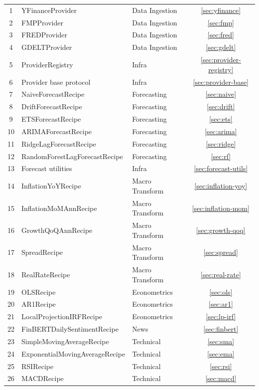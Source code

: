 \documentclass[11pt,a4paper]{article}
\begin{document}
\begin{longtable}{@{}cllc@{}}
  1 & YFinanceProvider & Data Ingestion & \ref{sec:yfinance} \\
  2 & FMPProvider & Data Ingestion & \ref{sec:fmp} \\
  3 & FREDProvider & Data Ingestion & \ref{sec:fred} \\
  4 & GDELTProvider & Data Ingestion & \ref{sec:gdelt} \\
  5 & ProviderRegistry & Infra & \ref{sec:provider-registry} \\
  6 & Provider base protocol & Infra & \ref{sec:provider-base} \\
  7 & NaiveForecastRecipe & Forecasting & \ref{sec:naive} \\
  8 & DriftForecastRecipe & Forecasting & \ref{sec:drift} \\
  9 & ETSForecastRecipe & Forecasting & \ref{sec:ets} \\
  10 & ARIMAForecastRecipe & Forecasting & \ref{sec:arima} \\
  11 & RidgeLagForecastRecipe & Forecasting & \ref{sec:ridge} \\
  12 & RandomForestLagForecastRecipe & Forecasting & \ref{sec:rf} \\
  13 & Forecast utilities & Infra & \ref{sec:forecast-utils} \\
  14 & InflationYoYRecipe & Macro Transform & \ref{sec:inflation-yoy} \\
  15 & InflationMoMAnnRecipe & Macro Transform & \ref{sec:inflation-mom} \\
  16 & GrowthQoQAnnRecipe & Macro Transform & \ref{sec:growth-qoq} \\
  17 & SpreadRecipe & Macro Transform & \ref{sec:spread} \\
  18 & RealRateRecipe & Macro Transform & \ref{sec:real-rate} \\
  19 & OLSRecipe & Econometrics & \ref{sec:ols} \\
  20 & AR1Recipe & Econometrics & \ref{sec:ar1} \\
  21 & LocalProjectionIRFRecipe & Econometrics & \ref{sec:lp-irf} \\
  22 & FinBERTDailySentimentRecipe & News & \ref{sec:finbert} \\
  23 & SimpleMovingAverageRecipe & Technical & \ref{sec:sma} \\
  24 & ExponentialMovingAverageRecipe & Technical & \ref{sec:ema} \\
  25 & RSIRecipe & Technical & \ref{sec:rsi} \\
  26 & MACDRecipe & Technical & \ref{sec:macd} \\

\end{longtable}
\end{document}
